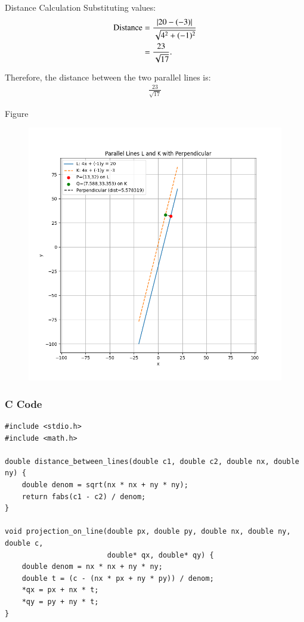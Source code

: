 \documentclass{beamer}
\begin{document}
\begin{frame}{Distance Calculation}
Substituting values:
\begin{align}
\text{Distance} &= \frac{\left\vert20 - (-3)\right\vert}{\sqrt{4^2 + (-1)^2}} \\
&= \frac{23}{\sqrt{17}}.
\end{align}


Therefore, the distance between the two parallel lines is:
\begin{align}
\frac{23}{\sqrt{17}}
\end{align}
\end{frame}

\begin{frame}{Figure}
\begin{figure}[h!]
    \centering
    \includegraphics[height=0.5\textheight, keepaspectratio]{figs/Figure_1.png}
\end{figure}
\end{frame}

\begin{frame}[fragile]
    \frametitle{C Code}
    \begin{lstlisting}
#include <stdio.h>
#include <math.h>

double distance_between_lines(double c1, double c2, double nx, double ny) {
    double denom = sqrt(nx * nx + ny * ny);
    return fabs(c1 - c2) / denom;
}

void projection_on_line(double px, double py, double nx, double ny, double c,
                        double* qx, double* qy) {
    double denom = nx * nx + ny * ny;
    double t = (c - (nx * px + ny * py)) / denom;
    *qx = px + nx * t;
    *qy = py + ny * t;
}




    \end{lstlisting}
\end{frame}
\end{document}
